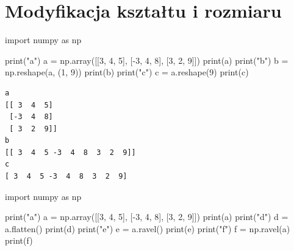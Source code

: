 \documentclass[
  polish,
  letterpaper,
  DIV=11,
  numbers=noendperiod]{scrreprt}
\newenvironment{Shaded}{\begin{snugshade}}{\end{snugshade}}
\newcommand{\BuiltInTok}[1]{\textcolor[rgb]{0.00,0.23,0.31}{#1}}
\newcommand{\DecValTok}[1]{\textcolor[rgb]{0.68,0.00,0.00}{#1}}
\newcommand{\ImportTok}[1]{\textcolor[rgb]{0.00,0.46,0.62}{#1}}
\newcommand{\NormalTok}[1]{\textcolor[rgb]{0.00,0.23,0.31}{#1}}
\newcommand{\OperatorTok}[1]{\textcolor[rgb]{0.37,0.37,0.37}{#1}}
\newcommand{\StringTok}[1]{\textcolor[rgb]{0.13,0.47,0.30}{#1}}
\begin{document}
\chapter{Modyfikacja kształtu i
rozmiaru}\label{modyfikacja-ksztaux142tu-i-rozmiaru}

\begin{Shaded}
\begin{Highlighting}[]
\ImportTok{import}\NormalTok{ numpy }\ImportTok{as}\NormalTok{ np}

\BuiltInTok{print}\NormalTok{(}\StringTok{"a"}\NormalTok{)}
\NormalTok{a }\OperatorTok{=}\NormalTok{ np.array([[}\DecValTok{3}\NormalTok{, }\DecValTok{4}\NormalTok{, }\DecValTok{5}\NormalTok{], [}\OperatorTok{{-}}\DecValTok{3}\NormalTok{, }\DecValTok{4}\NormalTok{, }\DecValTok{8}\NormalTok{], [}\DecValTok{3}\NormalTok{, }\DecValTok{2}\NormalTok{, }\DecValTok{9}\NormalTok{]])}
\BuiltInTok{print}\NormalTok{(a)}
\BuiltInTok{print}\NormalTok{(}\StringTok{"b"}\NormalTok{)}
\NormalTok{b }\OperatorTok{=}\NormalTok{ np.reshape(a, (}\DecValTok{1}\NormalTok{, }\DecValTok{9}\NormalTok{))}
\BuiltInTok{print}\NormalTok{(b)}
\BuiltInTok{print}\NormalTok{(}\StringTok{"c"}\NormalTok{)}
\NormalTok{c }\OperatorTok{=}\NormalTok{ a.reshape(}\DecValTok{9}\NormalTok{)}
\BuiltInTok{print}\NormalTok{(c)}
\end{Highlighting}
\end{Shaded}

\begin{verbatim}
a
[[ 3  4  5]
 [-3  4  8]
 [ 3  2  9]]
b
[[ 3  4  5 -3  4  8  3  2  9]]
c
[ 3  4  5 -3  4  8  3  2  9]
\end{verbatim}

\begin{Shaded}
\begin{Highlighting}[]
\ImportTok{import}\NormalTok{ numpy }\ImportTok{as}\NormalTok{ np}

\BuiltInTok{print}\NormalTok{(}\StringTok{"a"}\NormalTok{)}
\NormalTok{a }\OperatorTok{=}\NormalTok{ np.array([[}\DecValTok{3}\NormalTok{, }\DecValTok{4}\NormalTok{, }\DecValTok{5}\NormalTok{], [}\OperatorTok{{-}}\DecValTok{3}\NormalTok{, }\DecValTok{4}\NormalTok{, }\DecValTok{8}\NormalTok{], [}\DecValTok{3}\NormalTok{, }\DecValTok{2}\NormalTok{, }\DecValTok{9}\NormalTok{]])}
\BuiltInTok{print}\NormalTok{(a)}
\BuiltInTok{print}\NormalTok{(}\StringTok{"d"}\NormalTok{)}
\NormalTok{d }\OperatorTok{=}\NormalTok{ a.flatten()}
\BuiltInTok{print}\NormalTok{(d)}
\BuiltInTok{print}\NormalTok{(}\StringTok{"e"}\NormalTok{)}
\NormalTok{e }\OperatorTok{=}\NormalTok{ a.ravel()}
\BuiltInTok{print}\NormalTok{(e)}
\BuiltInTok{print}\NormalTok{(}\StringTok{"f"}\NormalTok{)}
\NormalTok{f }\OperatorTok{=}\NormalTok{ np.ravel(a)}
\BuiltInTok{print}\NormalTok{(f)}
\end{Highlighting}
\end{Shaded}
\end{document}
